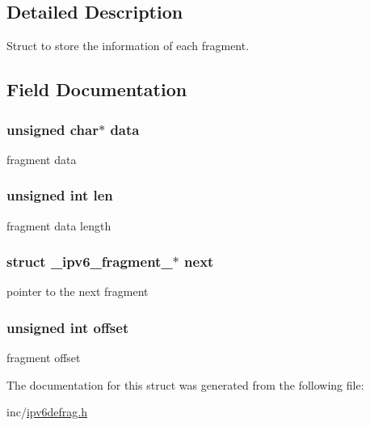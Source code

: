 \subsection{Detailed Description}
Struct to store the information of each fragment. 

\subsection{Field Documentation}
\hypertarget{struct__ipv6__fragment___ac24cea2bfcc927fd29bc74d1086707d8}{
\subsubsection[{data}]{\setlength{\rightskip}{0pt plus 5cm}unsigned char$\ast$ data}}\label{struct__ipv6__fragment___ac24cea2bfcc927fd29bc74d1086707d8}


fragment data 

\hypertarget{struct__ipv6__fragment___a77124bd5f7e31e6fffc19f335da0c23f}{
\subsubsection[{len}]{\setlength{\rightskip}{0pt plus 5cm}unsigned int len}}\label{struct__ipv6__fragment___a77124bd5f7e31e6fffc19f335da0c23f}


fragment data length 

\hypertarget{struct__ipv6__fragment___a36d606ad43ccc27ff8dedad831c346b1}{
\subsubsection[{next}]{\setlength{\rightskip}{0pt plus 5cm}struct {\bf \-\_\-ipv6\-\_\-fragment\-\_\-}$\ast$ next}}\label{struct__ipv6__fragment___a36d606ad43ccc27ff8dedad831c346b1}


pointer to the next fragment 

\hypertarget{struct__ipv6__fragment___a29b5297d3393519050e3126c4cb07c1c}{
\subsubsection[{offset}]{\setlength{\rightskip}{0pt plus 5cm}unsigned int offset}}\label{struct__ipv6__fragment___a29b5297d3393519050e3126c4cb07c1c}


fragment offset 



The documentation for this struct was generated from the following file\-:\begin{DoxyCompactItemize}
\item 
inc/\hyperlink{ipv6defrag_8h}{ipv6defrag.\-h}\end{DoxyCompactItemize}
